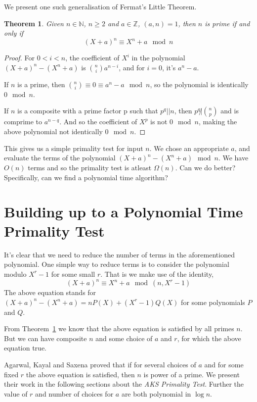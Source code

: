 \documentclass[11pt]{report}
\newtheorem{theorem}{Theorem}[section]
\begin{document}
We present one such generalisation of Fermat's Little Theorem.

\begin{theorem}
\label{theorem:GeneralisedFermatLittleTheorem}
Given $n \in \mathbb{N}$, $n \geq 2$ and $a \in \mathbb{Z}$, $(a,n) = 1$, then $n$ is prime if and only if
\[ (X+a)^n \equiv X^n + a \mod n \]
\end{theorem}

\begin{proof}
For $0 < i < n$, the coefficient of $X^i$ in the polynomial $(X+a)^n - (X^n + a)$ is ${n \choose i} a^{n-i}$, and for $i = 0$, it's $a^n - a$.

If $n$ is a prime, then ${n \choose i} \equiv 0 \equiv a^n - a \mod n$, so the polynomial is identically $0 \mod n$.

If $n$ is a composite with a prime factor p such that $p^q || n$, then $p^q \not | {n \choose p}$ and is comprime to $a^{n-q}$.
And so the coefficient of $X^p$ is not $0 \mod n$, making the above polynomial not identically $0 \mod n$.
\end{proof}
This gives us a simple primality test for input $n$. We chose an appropriate $a$, and evaluate the terms of the polynomial $(X+a)^n -(X^n + a) \mod n$. We have $O(n)$ terms and so the primality test is atleast $\Omega(n)$. Can we do better? Specifically, can we find a polynomial time algorithm?

\section {Building up to a Polynomial Time Primality Test}
It's clear that we need to reduce the number of terms in the aforementioned polynomial. One simple way to reduce terms is to consider the polynomial modulo $X^r - 1$ for some small $r$. That is we make use of the identity,
\[(X+a)^n \equiv X^n + a \mod (n, X^r - 1)\] 
The above equation stands for $(X+a)^n - (X^n + a) = nP(X) + (X^r - 1)Q(X)$ for some polynomials $P$ and $Q$.

From Theorem~\ref{theorem:GeneralisedFermatLittleTheorem} we know that the above equation is satisfied by all primes $n$. But we can have composite $n$ and some choice of $a$ and $r$, for which the above equation true. 

Agarwal, Kayal and Saxena proved that if for several choices of $a$ and for some fixed $r$ the above equation is satisfied, then $n$ is power of a prime. We present their work in the following sections about the \emph{AKS Primality Test}. Further the value of $r$ and number of choices for $a$ are both polynomial in $\log n$.
\end{document}
